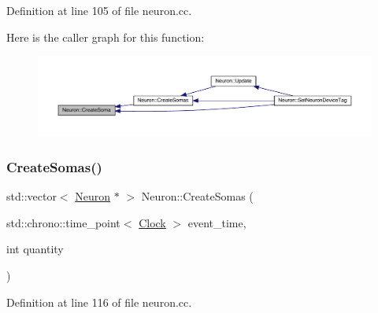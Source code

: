 Definition at line 105 of file neuron.\+cc.

Here is the caller graph for this function\+:
\nopagebreak
\begin{figure}[H]
\begin{center}
\leavevmode
\includegraphics[width=350pt]{class_neuron_a32593a869b25c778c1856c36704f49cf_icgraph}
\end{center}
\end{figure}
\mbox{\label{class_neuron_a2016d83b02bfe9e5548d5c24ef31dded}} 
\subsubsection{\texorpdfstring{Create\+Somas()}{CreateSomas()}}
{\footnotesize\ttfamily std\+::vector$<$ \hyperlink{class_neuron}{Neuron} $\ast$ $>$ Neuron\+::\+Create\+Somas (\begin{DoxyParamCaption}\item[{std\+::chrono\+::time\+\_\+point$<$ \hyperlink{universe_8h_a0ef8d951d1ca5ab3cfaf7ab4c7a6fd80}{Clock} $>$}]{event\+\_\+time,  }\item[{int}]{quantity }\end{DoxyParamCaption})}



Definition at line 116 of file neuron.\+cc.


